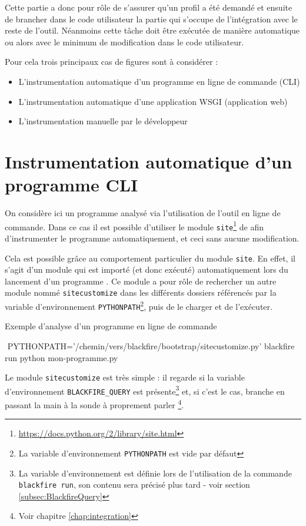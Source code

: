 Cette partie a donc pour rôle de s'assurer qu'un profil a été demandé et ensuite de brancher dans le \gls{code utilisateur} la partie qui s'occupe de l'intégration avec le reste de l'outil. Néanmoins cette tâche doit être exécutée de manière automatique ou alors avec le minimum de modification dans le code utilisateur.

Pour cela trois principaux cas de figures sont à considérer :
\begin{itemize}
\item L'instrumentation automatique d'un programme en ligne de commande (\gls{CLI})
\item L'instrumentation automatique d'une application \gls{WSGI} (application web)
\item L'instrumentation manuelle par le développeur
\end{itemize}

\section[Programme CLI]{Instrumentation automatique d'un programme CLI}
\label{sec:instru-pythonpath}
On considère ici un programme analysé via l'utilisation de l'outil en ligne de commande. Dans ce cas il est possible d'utiliser le module \verb|site|\footnote{\url{https://docs.python.org/2/library/site.html}} de \Python afin d'instrumenter le programme automatiquement, et ceci sans aucune modification.

Cela est possible grâce au comportement particulier du module \verb|site|. En effet, il s'agit d'un module qui est importé (et donc exécuté) automatiquement lors du lancement d'un programme \Python. Ce module a pour rôle de rechercher un autre module nommé \verb|sitecustomize| dans les différents dossiers référencés par la variable d'environnement \verb|PYTHONPATH|\footnote{La variable d'environnement \verb?PYTHONPATH? est vide par défaut}, puis de le charger et de l'exécuter.

\begin{listing}[H]
\caption{Exemple d'analyse d'un programme en ligne de commande}
\begin{bashcode}
 $ $ PYTHONPATH='/chemin/vers/blackfire/bootstrap/sitecustomize.py' blackfire run python mon-programme.py
\end{bashcode}
\end{listing}

Le module \verb|sitecustomize| est très simple : il regarde si la variable d'environnement \verb|BLACKFIRE_QUERY| est présente\footnote{La variable d'environnement est définie lors de l'utilisation de la commande \verb|blackfire run|, son contenu sera précisé plus tard - voir section \vref{subsec:BlackfireQuery}} et, si c'est le cas, branche \Blackfire en passant la main à la sonde à proprement parler \footnote{Voir chapitre \vref{chap:integration}}.

